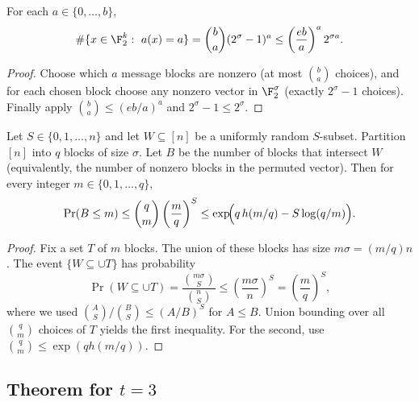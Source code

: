 \begin{lemma}\label{lem:bd-typecount-formal}
For each $a\in\{0,\dots,b\}$,
\[
\#\{x\in\F_2^k:\ a(x)=a\}
=\binom{b}{a}(2^\sigma-1)^a
\le \left(\frac{eb}{a}\right)^a 2^{\sigma a}.
\]
\end{lemma}
\begin{proof}
Choose which $a$ message blocks are nonzero (at most $\binom{b}{a}$ choices),
and for each chosen block choose any nonzero vector in $\F_2^\sigma$ (exactly $2^\sigma-1$ choices).
Finally apply $\binom{b}{a}\le (eb/a)^a$ and $2^\sigma-1\le 2^\sigma$.
\end{proof}

\begin{lemma}\label{lem:bd-occ-perm}
Let $S\in\{0,1,\dots,n\}$ and let $W\subseteq[n]$ be a uniformly random $S$-subset.
Partition $[n]$ into $q$ blocks of size $\sigma$.
Let $B$ be the number of blocks that intersect $W$ (equivalently, the number of nonzero blocks in the permuted vector).
Then for every integer $m\in\{0,1,\dots,q\}$,
\[
\Pr(B\le m)\le \binom{q}{m}\left(\frac{m}{q}\right)^S
\le \exp\!\Bigl(q\,h(m/q) - S\log(q/m)\Bigr).
\]
\end{lemma}
\begin{proof}
Fix a set $T$ of $m$ blocks. The union of these blocks has size $m\sigma=(m/q)n$.
The event $\{W\subseteq \cup T\}$ has probability
\[
\Pr(W\subseteq \cup T)
=\frac{\binom{m\sigma}{S}}{\binom{n}{S}}
\le \left(\frac{m\sigma}{n}\right)^S
=\left(\frac{m}{q}\right)^S,
\]
where we used $\binom{A}{S}/\binom{B}{S}\le (A/B)^S$ for $A\le B$.
Union bounding over all $\binom{q}{m}$ choices of $T$ yields the first inequality.
For the second, use $\binom{q}{m}\le \exp(q h(m/q))$.
\end{proof}


\subsection{Theorem for $t=3$}




